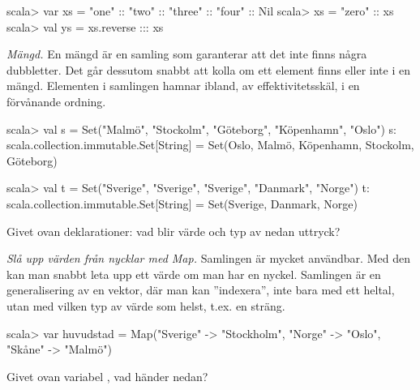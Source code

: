 \begin{REPL}
scala> var xs = "one" :: "two" :: "three" :: "four" :: Nil
scala> xs = "zero" :: xs
scala> val ys = xs.reverse ::: xs
\end{REPL}


\Task \emph{Mängd.} En mängd är en samling som garanterar att det inte finns några dubbletter. Det går dessutom snabbt att kolla om ett element finns eller inte i en mängd. Elementen i samlingen  hamnar ibland, av effektivitetsskäl, i en förvånande ordning.
\begin{REPL}
scala> val s = Set("Malmö", "Stockolm", "Göteborg", "Köpenhamn", "Oslo")
s: scala.collection.immutable.Set[String] = 
     Set(Oslo, Malmö, Köpenhamn, Stockolm, Göteborg)

scala> val t = Set("Sverige", "Sverige", "Sverige", "Danmark", "Norge")
t: scala.collection.immutable.Set[String] = Set(Sverige, Danmark, Norge)
\end{REPL}
Givet ovan deklarationer: vad blir värde och typ av nedan uttryck?

\Subtask {}

\Subtask {}

\Subtask {}

\Subtask {}

\Subtask {}

\Subtask {}

\Subtask {}

\Subtask {}

\Subtask {}

\Subtask {}

\Subtask {}

\Subtask {}

\Subtask {}

\Subtask {}

\Subtask {}


\Task \emph{Slå upp värden från nycklar med Map.} Samlingen  är mycket användbar. Med den kan man snabbt leta upp ett värde om man har en nyckel. Samlingen  är en generalisering av en vektor, där man kan ''indexera'', inte bara med ett heltal, utan med vilken typ av värde som helst, t.ex. en sträng.
\begin{REPL}
scala> var huvudstad = 
  Map("Sverige" -> "Stockholm", "Norge" -> "Oslo", "Skåne" -> "Malmö") 
\end{REPL}
Givet ovan variabel , vad händer nedan?

